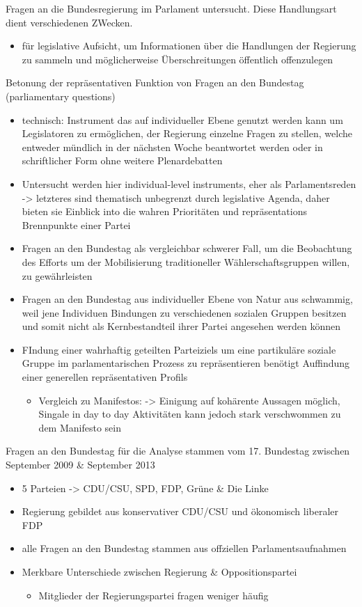 \documentclass[11pt]{article}
\begin{document}
Fragen an die Bundesregierung im Parlament untersucht. Diese Handlungsart dient verschiedenen ZWecken. 

\begin{itemize}
\item für legislative Aufsicht, um Informationen über die Handlungen der Regierung zu sammeln und möglicherweise Überschreitungen öffentlich offenzulegen
\end{itemize}

Betonung der repräsentativen Funktion von Fragen an den Bundestag (parliamentary questions)

\begin{itemize}
\item technisch: Instrument das auf individueller Ebene genutzt werden kann um Legislatoren zu ermöglichen, der Regierung einzelne Fragen zu stellen, welche entweder mündlich in der nächsten Woche beantwortet werden oder in schriftlicher Form ohne weitere Plenardebatten
\item Untersucht werden hier individual-level instruments, eher als Parlamentsreden -> letzteres sind thematisch unbegrenzt durch legislative Agenda, daher bieten sie Einblick into die wahren Prioritäten und repräsentations Brennpunkte einer Partei
\item Fragen an den Bundestag als vergleichbar schwerer Fall, um die Beobachtung des Efforts um der Mobilisierung traditioneller Wählerschaftsgruppen willen, zu gewährleisten
\item Fragen an den Bundestag aus individueller Ebene von Natur aus schwammig, weil jene Individuen Bindungen zu verschiedenen sozialen Gruppen besitzen und somit nicht als Kernbestandteil ihrer Partei angesehen werden können
\item FIndung einer wahrhaftig geteilten Parteiziels um eine partikuläre soziale Gruppe im parlamentarischen Prozess zu repräsentieren benötigt Auffindung einer generellen repräsentativen Profils 
\begin{itemize}
\item Vergleich zu Manifestos: -> Einigung auf kohärente Aussagen möglich, Singale in day to day Aktivitäten kann jedoch stark verschwommen zu dem Manifesto sein
\end{itemize}
\end{itemize}

Fragen an den Bundestag für die Analyse stammen vom 17. Bundestag zwischen September 2009 \& September 2013 

\begin{itemize}
\item 5 Parteien -> CDU/CSU, SPD, FDP, Grüne \& Die Linke
\item Regierung gebildet aus konservativer CDU/CSU und ökonomisch liberaler FDP
\item alle Fragen an den Bundestag stammen aus offziellen Parlamentsaufnahmen
\item Merkbare Unterschiede zwischen Regierung \& Oppositionspartei 
\begin{itemize}
\item Mitglieder der Regierungspartei fragen weniger häufig
\end{itemize}
\end{itemize}
\end{document}
